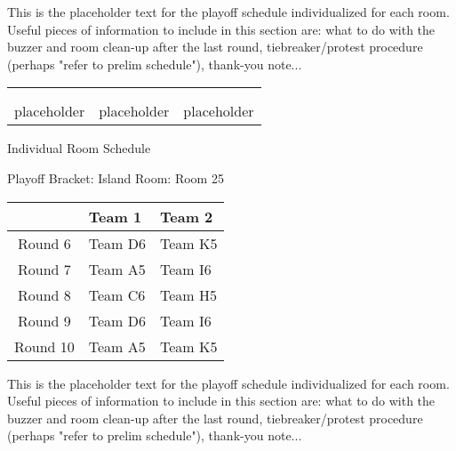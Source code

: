 \documentclass{article}%
\begin{document}
\vspace*{16pt}%
\linebreak%
This is the placeholder text for the playoff schedule individualized for each room. Useful pieces of information to include in this section are: what to do with the buzzer and room clean{-}up after the last round, tiebreaker/protest procedure (perhaps "refer to prelim schedule"), thank{-}you note...%
\vspace*{30pt}%
\newline%
%
\begin{tabularx}{\textwidth}{YYY}%
  &  &  \\%
\\%
placeholder&placeholder&placeholder\\%
\end{tabularx}%
\newpage%
\begin{center}%
\begin{Huge}%
Individual Room Schedule%
\end{Huge}%
\vspace*{16pt}%
\linebreak%
\begin{Large}%
Playoff Bracket: Island \hfill Room: Room 25%
\end{Large}%
\end{center}%
%
\begin{tabularx}{\textwidth}{|c|Y|Y|}%
\hline%
&Team 1&Team 2\\%
\hline%
Round 6&Team D6&Team K5\\%
Round 7&Team A5&Team I6\\%
Round 8&Team C6&Team H5\\%
Round 9&Team D6&Team I6\\%
Round 10&Team A5&Team K5\\%
\hline%
\end{tabularx}%
\vspace*{16pt}%
\linebreak%
This is the placeholder text for the playoff schedule individualized for each room. Useful pieces of information to include in this section are: what to do with the buzzer and room clean{-}up after the last round, tiebreaker/protest procedure (perhaps "refer to prelim schedule"), thank{-}you note...%
\vspace*{30pt}%
\newline%
\end{document}

